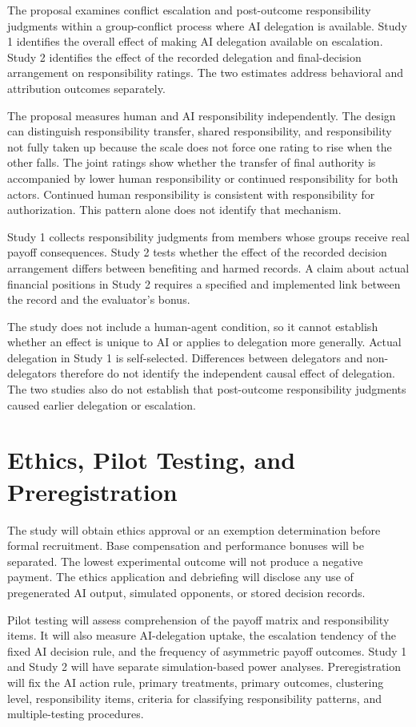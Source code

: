 \documentclass[11pt,a4paper]{article}
\begin{document}
The proposal examines conflict escalation and post-outcome responsibility judgments within a group-conflict process where AI delegation is available. Study 1 identifies the overall effect of making AI delegation available on escalation. Study 2 identifies the effect of the recorded delegation and final-decision arrangement on responsibility ratings. The two estimates address behavioral and attribution outcomes separately.

The proposal measures human and AI responsibility independently. The design can distinguish responsibility transfer, shared responsibility, and responsibility not fully taken up because the scale does not force one rating to rise when the other falls. The joint ratings show whether the transfer of final authority is accompanied by lower human responsibility or continued responsibility for both actors. Continued human responsibility is consistent with responsibility for authorization. This pattern alone does not identify that mechanism.

Study 1 collects responsibility judgments from members whose groups receive real payoff consequences. Study 2 tests whether the effect of the recorded decision arrangement differs between benefiting and harmed records. A claim about actual financial positions in Study 2 requires a specified and implemented link between the record and the evaluator's bonus.

The study does not include a human-agent condition, so it cannot establish whether an effect is unique to AI or applies to delegation more generally. Actual delegation in Study 1 is self-selected. Differences between delegators and non-delegators therefore do not identify the independent causal effect of delegation. The two studies also do not establish that post-outcome responsibility judgments caused earlier delegation or escalation.

\section{Ethics, Pilot Testing, and Preregistration}

The study will obtain ethics approval or an exemption determination before formal recruitment. Base compensation and performance bonuses will be separated. The lowest experimental outcome will not produce a negative payment. The ethics application and debriefing will disclose any use of pregenerated AI output, simulated opponents, or stored decision records.

Pilot testing will assess comprehension of the payoff matrix and responsibility items. It will also measure AI-delegation uptake, the escalation tendency of the fixed AI decision rule, and the frequency of asymmetric payoff outcomes. Study 1 and Study 2 will have separate simulation-based power analyses. Preregistration will fix the AI action rule, primary treatments, primary outcomes, clustering level, responsibility items, criteria for classifying responsibility patterns, and multiple-testing procedures.
\end{document}
